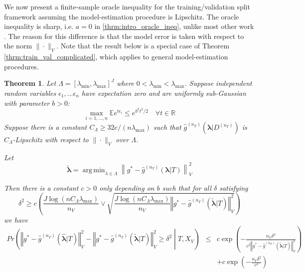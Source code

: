 \documentclass[12pt]{article}
\newtheorem{theorem}{Theorem}
\DeclareMathOperator*{\argmin}{arg\,min}
\begin{document}
We now present a finite-sample oracle inequality for the training/validation split framework assuming the model-estimation procedure is Lipschitz. The oracle inequality is sharp, i.e. $a=0$ in \eqref{thrm:intro_oracle_ineq}, unlike most other work \citep{gyorfi2006distribution, lecue2012oracle, van2003unified}. The reason for this difference is that the model error is taken with respect to the norm $\| \cdot \|_V$. Note that the result below is a special case of Theorem \ref{thrm:train_val_complicated}, which applies to general model-estimation procedures. 
\begin{theorem}
\label{thrm:train_val}
Let $\Lambda=[\lambda_{\min},\lambda_{\max}]^{J}$ where $0 < \lambda_{\min} < \lambda_{\max}$. Suppose independent random variables $\epsilon_1, ... \epsilon_n$ have expectation zero and are uniformly sub-Gaussian with parameter $b > 0$:
$$
\max_{i=1,...,n} \mathbb{E} e^{t \epsilon_i} \le e^{b^2t^2/2} \quad \forall t \in \mathbb{R}
$$
Suppose there is a constant $C_\Lambda \ge 32e/(n \lambda_{\max})$ such that $\hat g^{(n_T)}(\boldsymbol{\lambda} |D^{(n_T)})$ is $C_\Lambda$-Lipschitz with respect to $\| \cdot \|_V$ over $\Lambda$.

Let 
\begin{equation}
\tilde{\boldsymbol \lambda} = \argmin_{\lambda \in \Lambda} \left \| g^*-\hat{g}^{(n_T)}( \boldsymbol{\lambda} | T) \right \|_{V}^{2}
\label{eq:tilde_lambda_def}
\end{equation}

Then there is a constant $c>0$ only depending on $b$ such that for all $\delta$ satisfying
\begin{equation}
\delta^{2}
\ge
c \left ( 
\frac{J\log (n C_\Lambda\lambda_{\max})}{n_{V}}
\vee 
\sqrt{\frac{J \log (n C_\Lambda \lambda_{\max})}{n_{V}}\left\Vert g^* - \hat{g}^{(n_T)}( \tilde{\boldsymbol{\lambda}} | T)\right\Vert_{V}^2}
\right )
\label{thrm:train_val_delta}
\end{equation}
we have
\begin{eqnarray*}
	Pr\left(
	\left\Vert g^* - \hat{g}^{(n_T)}( \hat{\boldsymbol{\lambda}} | T) \right\Vert _{V}^2 -
	\left\Vert g^* - \hat{g}^{(n_T)}( \tilde{\boldsymbol{\lambda}} | T) \right\Vert _{V}^2
	\ge\delta^2
	\middle | 
	T, X_V
	\right )
	&\le& c\exp\left(-\frac{n_{V}\delta^{4}}{
		c^{2}
		\left\Vert g^* - \hat{g}^{(n_T)}( \tilde{\boldsymbol{\lambda}} | T) \right\Vert _{V}^2
	}\right) \\
	&& +c\exp\left(-\frac{n_{V}\delta^{2}}{c^{2}}\right) \\
\end{eqnarray*}

\end{theorem}
\end{document}
